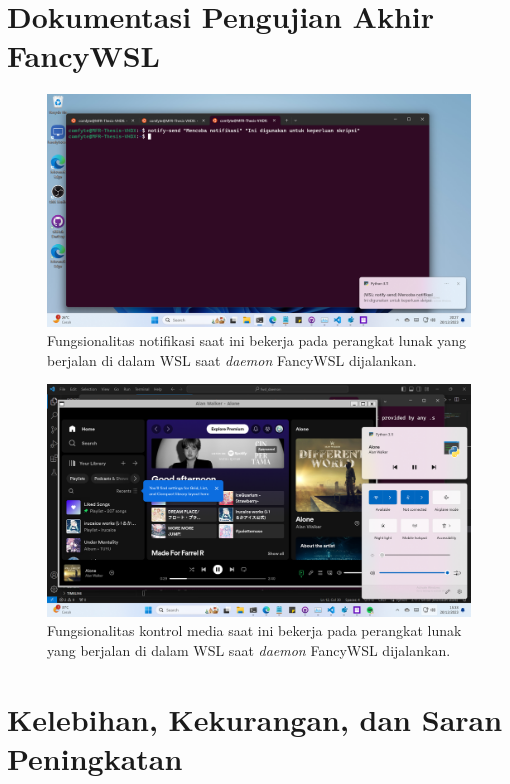 \section{Dokumentasi Pengujian Akhir FancyWSL}

\begin{figure}[H]
    \centering
    \includegraphics[width=1\linewidth]{assets/Screenshot 2023-12-20 202713.png}
    \caption{Fungsionalitas notifikasi saat ini bekerja pada perangkat lunak yang berjalan di dalam WSL saat \textit{daemon} FancyWSL dijalankan.}
    \label{fig:enter-label}
\end{figure}

\begin{figure}[H]
    \centering
    \includegraphics[width=1\linewidth]{assets/Screenshot 2023-12-20 153317.png}
    \caption{Fungsionalitas kontrol media saat ini bekerja pada perangkat lunak yang berjalan di dalam WSL saat \textit{daemon} FancyWSL dijalankan.}
    \label{fig:enter-label}
\end{figure}

\section{Kelebihan, Kekurangan, dan Saran Peningkatan}

